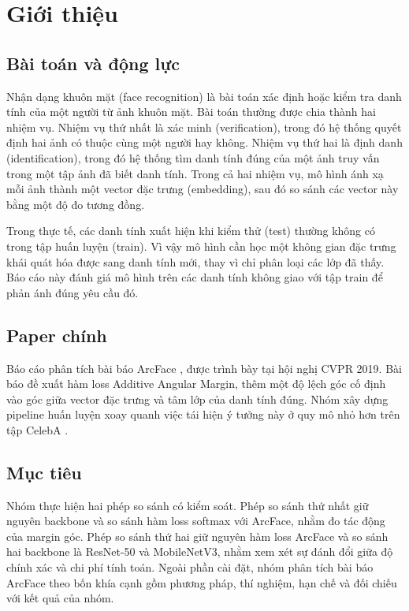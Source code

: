 \documentclass[a4paper,12pt]{article}
\begin{document}
\section{Giới thiệu}\label{sec:intro}

\subsection{Bài toán và động lực}
Nhận dạng khuôn mặt (face recognition) là bài toán xác định hoặc kiểm tra danh tính của một người từ ảnh khuôn mặt. Bài toán thường được chia thành hai nhiệm vụ. Nhiệm vụ thứ nhất là xác minh (verification), trong đó hệ thống quyết định hai ảnh có thuộc cùng một người hay không. Nhiệm vụ thứ hai là định danh (identification), trong đó hệ thống tìm danh tính đúng của một ảnh truy vấn trong một tập ảnh đã biết danh tính. Trong cả hai nhiệm vụ, mô hình ánh xạ mỗi ảnh thành một vector đặc trưng (embedding), sau đó so sánh các vector này bằng một độ đo tương đồng.

Trong thực tế, các danh tính xuất hiện khi kiểm thử (test) thường không có trong tập huấn luyện (train). Vì vậy mô hình cần học một không gian đặc trưng khái quát hóa được sang danh tính mới, thay vì chỉ phân loại các lớp đã thấy. Báo cáo này đánh giá mô hình trên các danh tính không giao với tập train để phản ánh đúng yêu cầu đó.

\subsection{Paper chính}
Báo cáo phân tích bài báo ArcFace \cite{deng2019arcface}, được trình bày tại hội nghị CVPR 2019. Bài báo đề xuất hàm loss Additive Angular Margin, thêm một độ lệch góc cố định vào góc giữa vector đặc trưng và tâm lớp của danh tính đúng. Nhóm xây dựng pipeline huấn luyện xoay quanh việc tái hiện ý tưởng này ở quy mô nhỏ hơn trên tập CelebA \cite{liu2015celeba}.

\subsection{Mục tiêu}
Nhóm thực hiện hai phép so sánh có kiểm soát. Phép so sánh thứ nhất giữ nguyên backbone và so sánh hàm loss softmax với ArcFace, nhằm đo tác động của margin góc. Phép so sánh thứ hai giữ nguyên hàm loss ArcFace và so sánh hai backbone là ResNet-50 và MobileNetV3, nhằm xem xét sự đánh đổi giữa độ chính xác và chi phí tính toán. Ngoài phần cài đặt, nhóm phân tích bài báo ArcFace theo bốn khía cạnh gồm phương pháp, thí nghiệm, hạn chế và đối chiếu với kết quả của nhóm.
\end{document}

